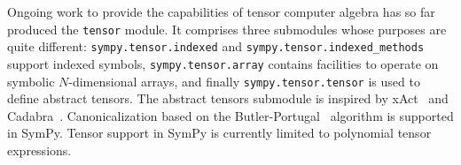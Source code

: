Ongoing work to provide the capabilities of tensor computer algebra has so far
produced the \verb|tensor| module.  It comprises three
submodules whose purposes are quite different: \texttt{sympy.\allowbreak{}tensor.\allowbreak{}indexed} and
\texttt{sympy.\allowbreak{}tensor.\allowbreak{}indexed\_methods} support indexed symbols,
\texttt{sympy.\allowbreak{}tensor.\allowbreak{}array} contains facilities to operate on symbolic $N$-dimensional
arrays, and finally \texttt{sympy.\allowbreak{}tensor.\allowbreak{}tensor} is used to define abstract tensors.
The abstract tensors submodule
is inspired by xAct~\cite{xAct} and Cadabra~\cite{Peeters2007cadabra}.
Canonicalization based on the Butler-Portugal~\cite{ManssurPortugal1999}
algorithm is supported in SymPy.  Tensor support in SymPy is currently limited to polynomial tensor
expressions.
